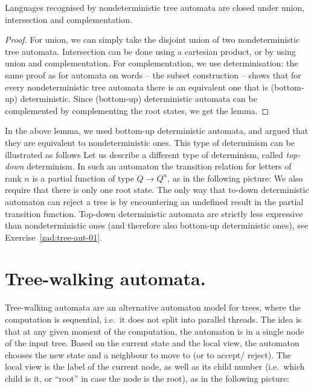 \begin{lemma}\label{lem:tree-aut-bool-alg}
  Languages recognised by nondeterministic tree automata are closed under union, intersection and complementation.
\end{lemma}
\begin{proof} For union, we can simply take the disjoint union of two nondeterministic tree automata. Intersection can be done using a cartesian product, or by using union and complementation.  For complementation, we use determinisation: the same proof as for automata on words -- the subset construction -- shows that for every nondeterministic tree automata there is an equivalent one that is (bottom-up) deterministic. Since (bottom-up) deterministic automata can be complemented by complementing the root states, we get the lemma.
\end{proof}



\begin{example}
	In the above lemma, we used bottom-up deterministic automata, and argued that they are equivalent to nondeterministic ones. This type of determinism can be illustrated as follows 
	Let us describe a different type of determinism, called \emph{top-down} determinism. In such an automaton the transition relation for letters of rank $n$ is a partial function of type $Q \to Q^n$, as in the following picture:
	We also require that there is only one root state. The only way that to-down deterministic automaton can reject a tree is by encountering an undefined result in the partial transition function. Top-down deterministic automata are  strictly less expressive than nondeterministic ones (and therefore also bottom-up deterministic ones), see Exercise~\ref{zad:tree-aut-01}.
\end{example}

\section{Tree-walking automata.} Tree-walking automata are an alternative automaton model for trees, where the computation is sequential, i.e.~it does not split into parallel threads.  The idea is that at any given moment of the computation, the automaton is in a single node of the input tree. Based on the current state and the local view, 
 the automaton chooses the new state and a neighbour to move to (or to accept/ reject). The local view is the label of the current node, as well as its child number (i.e.~which child is it, or ``root'' in case the node is the root), as in the following picture:

